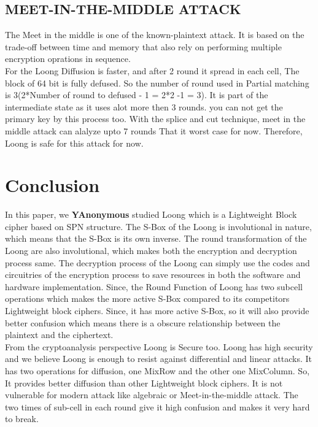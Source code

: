 \documentclass[preprint]{transcrypto}
\begin{document}
\subsection{MEET-IN-THE-MIDDLE ATTACK}
The Meet in the middle is one of the known-plaintext attack. It is based on the trade-off between time and memory that also rely on performing multiple encryption oprations in sequence.\\
For the Loong Diffusion is faster, and after 2 round it spread in each cell, The block of 64 bit is fully defused. So the number of round used in Partial matching is 3(2*Number of round to defused - 1 = 2*2 -1 = 3). It is part of the intermediate state as it uses alot more then 3 rounds. you can not get the primary key by this process too. With the splice and cut technique, meet in the middle attack can alalyze upto 7 rounds That it worst case for now. Therefore, Loong is safe for this attack for now.  


\section{Conclusion}
In this paper, we \textbf{YAnonymous} studied Loong which is a Lightweight Block cipher based on SPN structure. The S-Box of the Loong is involutional in nature, which means that the S-Box is its own inverse. The round transformation of the Loong are also involutional, which makes both the encryption and decryption process same. The decryption process of the Loong can simply use the codes and circuitries of the encryption process to save resources in both the software and hardware implementation. Since, the Round Function of Loong has two subcell operations which makes the more active S-Box compared to its competitors Lightweight block ciphers. Since, it has more active S-Box, so it will also provide better confusion which means there is a obscure relationship between the plaintext and the ciphertext.\\
From the cryptoanalysis perspective Loong is Secure too. Loong has high security and we believe Loong is enough to resist against differential and linear attacks. It has two operations for diffusion, one MixRow and the other one MixColumn. So, It provides better diffusion than other Lightweight block ciphers. It is not vulnerable for modern attack like algebraic or Meet-in-the-middle attack. The two times of sub-cell in each round give it high confusion and makes it very hard to break.
\end{document}

